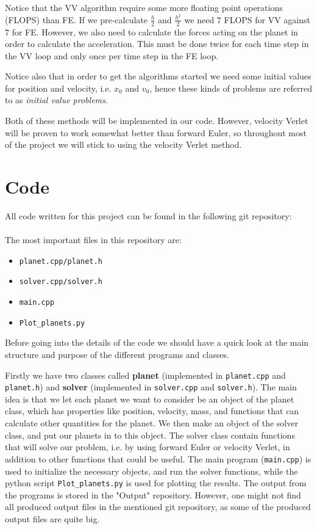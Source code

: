 \documentclass[12pt, a4paper]{article}
\begin{document}
Notice that the VV algorithm require some more floating point operations (FLOPS) than FE. If we 
pre-calculate $\frac{h}{2}$ and $\frac{h^2}{2}$ we need $7$ FLOPS for VV against $7$ for FE. However, 
we also need to calculate the forces acting on the planet in order to calculate the acceleration. This 
must be done twice for each time step in the VV loop and only once per time step in the FE loop. 

Notice also that in order to get the algorithms started we need some initial values for position and 
velocity, i.e. $x_0$ and $v_0$, hence these kinds of problems are referred to as \textit{initial 
value problems}.   

Both of these methods will be implemented in our code. However, velocity Verlet will be 
proven to work somewhat better than forward Euler, so throughout most of the project we 
will stick to using the velocity Verlet method.  

\section{Code}

All code written for this project can be found in the following git repository: \vspace{0.5cm} \\ 
 \vspace{0.5cm} \\ 
The most important files in this repository are:  
\begin{itemize}
\item \texttt{planet.cpp/planet.h}
\item \texttt{solver.cpp/solver.h}
\item \texttt{main.cpp}
\item \texttt{Plot\_planets.py}
\end{itemize}
Before going into the details of the code we should have a quick look at the main structure and purpose 
of the different programs and classes. 

Firstly we have two classes called \textbf{planet} (implemented in \texttt{planet.cpp} and 
\texttt{planet.h}) and \textbf{solver} (implemented in \texttt{solver.cpp} and \texttt{solver.h}). 
The main idea is that we let each planet we want to consider be an object of the planet class, 
which has properties like position, velocity, mass, and functions that can calculate other quantities 
for the planet. We then make an object of the solver class, and put our planets in to this object. 
The solver class contain functions that will solve our problem, i.e. by using forward Euler or 
velocity Verlet, in addition to other functions that could be useful. The main program (\texttt{main.cpp}) 
is used to initialize the necessary objects, and run the solver functions, while the python script 
\texttt{Plot\_planets.py} is used for plotting the results. The output from the programs is stored in 
the "Output" repository. However, one might not find all produced output files in the mentioned git 
repository, as some of the produced output files are quite big.  
\end{document}
